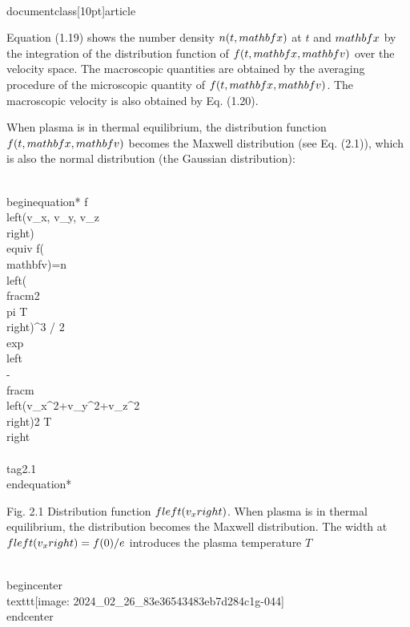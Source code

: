 \\documentclass[10pt]{article}
\begin{document}
Equation (1.19) shows the number density $n(t, \\mathbf{x})$ at $t$ and $\\mathbf{x}$ by the integration of the distribution function of $f(t, \\mathbf{x}, \\mathbf{v})$ over the velocity space. The macroscopic quantities are obtained by the averaging procedure of the microscopic quantity of $f(t, \\mathbf{x}, \\mathbf{v})$. The macroscopic velocity is also obtained by Eq. (1.20).

When plasma is in thermal equilibrium, the distribution function $f(t, \\mathbf{x}, \\mathbf{v})$ becomes the Maxwell distribution (see Eq. (2.1)), which is also the normal distribution (the Gaussian distribution):


\\begin{equation*}
f\\left(v_{x}, v_{y}, v_{z}\\right) \\equiv f(\\mathbf{v})=n\\left(\\frac{m}{2 \\pi T}\\right)^{3 / 2} \\exp \\left\\{-\\frac{m\\left(v_{x}^{2}+v_{y}^{2}+v_{z}^{2}\\right)}{2 T}\\right\\} \\tag{2.1}
\\end{equation*}


Fig. 2.1 Distribution function $f\\left(v_{x}\\right)$. When plasma is in thermal equilibrium, the distribution becomes the Maxwell distribution. The width at $f\\left(v_{x}\\right)=f(0) / e$ introduces the plasma temperature $T$

\\begin{center}
\\texttt{[image: 2024\_02\_26\_83e36543483eb7d284c1g-044]}
\\end{center}
\end{document}
